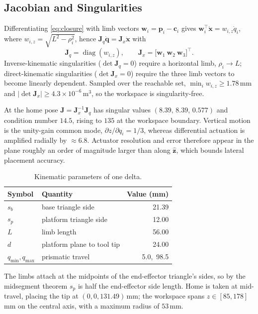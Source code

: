 \subsection{Jacobian and Singularities}

Differentiating \eqref{eq:closure} with limb vectors
$\mathbf{w}_i=\mathbf{p}_i-\mathbf{c}_i$ gives
$\mathbf{w}_i^{\!\top}\dot{\mathbf{x}}=w_{i,z}\dot{q}_i$, where
$w_{i,z}=\sqrt{L^2-\rho_i^2}$, hence
$\mathbf{J}_q\dot{\mathbf{q}}=\mathbf{J}_x\dot{\mathbf{x}}$ with
\begin{equation}
\label{eq:jac}
\mathbf{J}_q=\operatorname{diag}(w_{i,z}),\qquad
\mathbf{J}_x=\big[\mathbf{w}_1\ \mathbf{w}_2\ \mathbf{w}_3\big]^{\!\top}.
\end{equation}
Inverse-kinematic singularities ($\det\mathbf{J}_q=0$) require a horizontal limb,
$\rho_i\to L$; direct-kinematic singularities ($\det\mathbf{J}_x=0$) require the
three limb vectors to become linearly dependent. Sampled over the reachable set,
$\min_i w_{i,z}\ge1.78$\,mm and $|\det\mathbf{J}_x|\ge4.3\times10^{-6}$\,m$^3$,
so the workspace is singularity-free.

At the home pose $\mathbf{J}=\mathbf{J}_x^{-1}\mathbf{J}_q$ has singular values
$(8.39,\,8.39,\,0.577)$ and condition number $14.5$, rising to $135$ at the
workspace boundary. Vertical motion is the unity-gain common mode,
$\partial z/\partial q_i=1/3$, whereas differential actuation is amplified
radially by $\approx\!6.8$. Actuator resolution and error therefore appear in
the plane roughly an order of magnitude larger than along $\hat{\mathbf{z}}$,
which bounds lateral placement accuracy.

\begin{table}[t]
\caption{Kinematic parameters of one delta.}
\label{tab:params}
\centering
\begin{tabular}{llr}
\toprule
Symbol & Quantity & Value (mm) \\
\midrule
$s_b$ & base triangle side & 21.39 \\
$s_p$ & platform triangle side & 12.00 \\
$L$   & limb length & 56.00 \\
$d$   & platform plane to tool tip & 24.00 \\
$q_{\min},q_{\max}$ & prismatic travel & 5.0,\ 98.5 \\
\bottomrule
\end{tabular}
\end{table}

The limbs attach at the midpoints of the end-effector triangle's sides, so by
the midsegment theorem $s_p$ is half the end-effector side length. Home is taken
at mid-travel, placing the tip at $(0,0,131.49)$\,mm; the workspace spans
$z\in[85,178]$\,mm on the central axis, with a maximum radius of $53$\,mm.
